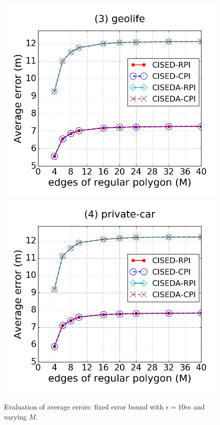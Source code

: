 \begin{figure}[tb!]
\includegraphics[scale = 0.250]{figures/Exp-M-e-20-error-geolife.png}
\includegraphics[scale = 0.250]{figures/Exp-M-e-20-error-private.png}
\vspace{-2ex}
\caption{\small Evaluation of average errors: fixed error bound with $\epsilon = 10m$ and varying $M$.}
\label{fig:m-error-e20}
\vspace{-2ex}
\end{figure}

